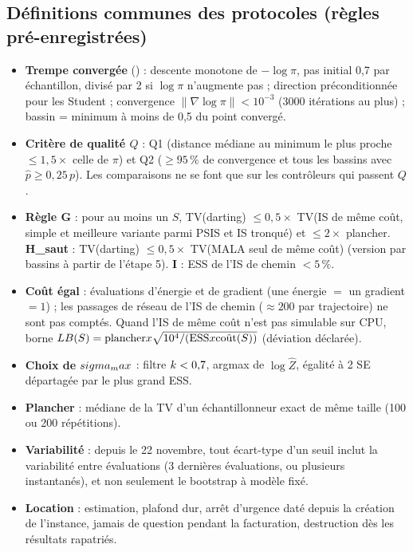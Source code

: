 \subsection{Définitions communes des protocoles (règles pré-enregistrées)}
\begin{itemize}
  \item \textbf{Trempe convergée} () : descente monotone de $-\log\pi$, pas initial 0,7 par échantillon, divisé par 2 si $\log\pi$ n'augmente pas ; direction préconditionnée pour les Student ; convergence $\|\nabla\log\pi\|<10^{-3}$ (3000 itérations au plus) ; bassin = minimum à moins de 0,5 du point convergé.
  \item \textbf{Critère de qualité $Q$} : Q1 (distance médiane au minimum le plus proche $\le1{,}5\times$ celle de $\pi$) et Q2 ($\ge95\,\%$ de convergence et tous les bassins avec $\hat p\ge0{,}25\,p$). Les comparaisons ne se font que sur les contrôleurs qui passent $Q$.
  \item \textbf{Règle G} : pour au moins un $S$, TV(darting) $\le0{,}5\times$ TV(IS de même coût, simple et meilleure variante parmi PSIS et IS tronqué) et $\le2\times$ plancher. \textbf{H\_saut} : TV(darting) $\le0{,}5\times$ TV(MALA seul de même coût) (version par bassins à partir de l'étape 5). \textbf{I} : ESS de l'IS de chemin $<5\,\%$.
  \item \textbf{Coût égal} : évaluations d'énergie et de gradient (une énergie $=$ un gradient $=1$) ; les passages de réseau de l'IS de chemin ($\approx200$ par trajectoire) ne sont pas comptés. Quand l'IS de même coût n'est pas simulable sur CPU, borne $LB(S)=\text{plancher}x\sqrt{10^4/(\mathrm{ESS}x\text{coût}(S))}$ (déviation déclarée).
  \item \textbf{Choix de $sigma_max$} : filtre $k<0{,}7$, argmax de $\log\hat Z$, égalité à 2 SE départagée par le plus grand ESS.
  \item \textbf{Plancher} : médiane de la TV d'un échantillonneur exact de même taille (100 ou 200 répétitions).
  \item \textbf{Variabilité} : depuis le 22 novembre, tout écart-type d'un seuil inclut la variabilité entre évaluations (3 dernières évaluations, ou plusieurs instantanés), et non seulement le bootstrap à modèle fixé.
  \item \textbf{Location} : estimation, plafond dur, arrêt d'urgence daté depuis la création de l'instance, jamais de question pendant la facturation, destruction dès les résultats rapatriés.
\end{itemize}
